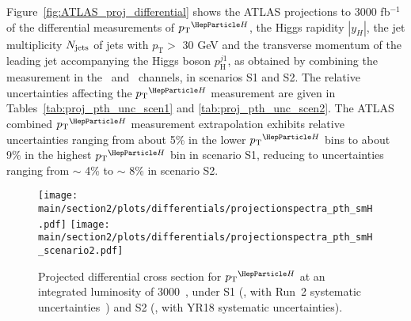 Figure~\ref{fig:ATLAS_proj_differential} shows the ATLAS projections to 3000 fb$^{-1}$ of the differential measurements of $\pTH$, the Higgs rapidity $|y_H|$, the jet multiplicity $N_{\rm jets}$ of jets with $p_{\mathrm{T}} >$ 30 GeV and the transverse momentum of the leading jet accompanying the Higgs boson $p_{\mathrm{H}}^{j1}$, as obtained by combining the measurement in the \Hyy\ and \HZZ\ channels, in scenarios S1 and S2. The relative uncertainties affecting the $\pTH$ measurement are given in Tables~\ref{tab:proj_pth_unc_scen1} and \ref{tab:proj_pth_unc_scen2}.
The ATLAS combined $\pTH$ measurement extrapolation exhibits relative uncertainties ranging from about 5\% in the lower $\pTH$ bins to about 9\% in the highest $\pTH$ bin in scenario S1, reducing to uncertainties ranging from $\sim$ 4\% to $\sim$ 8\% in scenario S2.

\begin{figure}%
  \begin{center}
    \texttt{[image: \\main/section2/plots/differentials/projectionspectra\_pth\_smH.pdf]}
    \texttt{[image: \\main/section2/plots/differentials/projectionspectra\_pth\_smH\_scenario2.pdf]}
    \caption{
        Projected differential cross section for $\pTH$ at an integrated luminosity of 3000\fbinv ~\cite{Sirunyan:2018sgc}, under S1 (\UcmsLeft, with Run~2 systematic uncertainties~\cite{CMS-PAS-HIG-17-028}) and S2 (\UcmsRight, with YR18 systematic uncertainties).
        }
    \label{fig:proj_pth}
  \end{center}
\end{figure}


